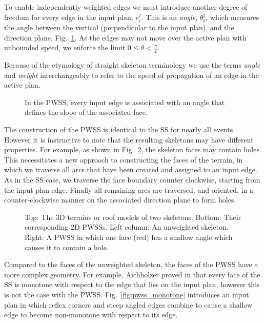 To enable independently weighted edges we must introduce another degree of freedom for every edge in the input plan, $e^j_i$.  This is an \emph{angle}, $\theta^j_i$, which measures the angle between the vertical (perpendicular to the input plan), and the direction plane, Fig.~\ref{fig:wss_terms}. As the edges may not move over the active plan with unbounded speed, we enforce the limit $0 \le \theta < \frac{\pi}{2}$. 

Because of the etymology of straight skeleton terminology we use the terms \emph{angle} and \emph{weight} interchangeably to refer to the speed of propagation of an edge in the active plan. 

\begin{figure}
  \centering
  \def\svgwidth{0.7\columnwidth}
  
  \caption[Positively weighted straight skeleton terminology]{\label{fig:wss_terms}In the PWSS, every input edge is associated with an angle that defines the slope of the associated face.}
\end{figure}

The construction of the PWSS is identical to the SS for nearly all events. However it is instructive to note that the resulting skeletons may have different properties. For example, as shown in Fig.~\ref{fig:pwss_properties}, the skeleton faces may contain holes. This necessitates a new approach to constructing the faces of the terrain, in which we traverse all arcs that have been created and assigned to an input edge. As in the SS case, we traverse the face boundary counter clockwise, starting from the input plan edge. Finally all remaining arcs are traversed, and oriented, in a counter-clockwise manner on the associated direction plane to form holes. 

\begin{figure}
  \centering
  \def\svgwidth{0.7\columnwidth}
  
  \caption[A PWSS may contain holes]{\label{fig:pwss_properties}Top: The 3D terrains or roof models of two skeletons. Bottom: Their corresponding 2D PWSSs. Left column: An unweighted skeleton. Right: A PWSS in which one face (red) has a shallow angle which causes it to contain a hole.}
\end{figure}

Compared to the faces of the unweighted skeleton, the faces of the PWSS have a more complex geometry. For example, Aichholzer proved in \cite{Aichholzer95} that every face of the SS is monotone with respect to the edge that lies on the input plan, however this is not the case with the PWSS. Fig.~\ref{fig:pwss_monotone} introduces an input plan in which reflex corners and steep angled edges combine to cause a shallow edge to become non-monotone with respect to its edge.

